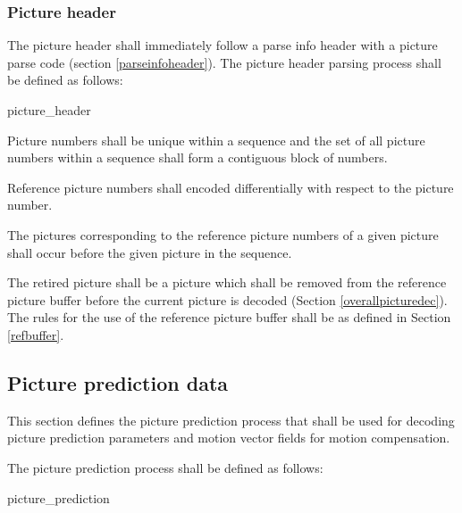 \subsubsection{Picture header}
\label{pictureheader}

The picture header shall immediately follow a parse info header with a picture parse 
code (section \ref{parseinfoheader}). The picture header parsing process shall be defined as follows:

\begin{pseudo}{picture\_header}{}
    \bsEND\bsEND
{}
\bsEND
\end{pseudo}

Picture numbers shall be unique within a sequence and the set of all picture numbers
within a sequence shall form a contiguous block of numbers.

Reference picture numbers shall encoded differentially with respect to the
picture number.

The pictures corresponding to the reference picture numbers of a given picture
shall occur before the given picture in the sequence.

The retired picture shall be a picture which shall be removed from 
the reference picture buffer before the current picture is decoded
(Section \ref{overallpicturedec}). The rules for the 
use of the reference picture buffer shall be as defined in Section \ref{refbuffer}.

\subsection{Picture prediction data}
\label{pictureprediction}

This section defines the picture prediction process that shall be used for decoding 
picture prediction parameters and motion vector fields for motion compensation.

The picture prediction process shall be defined as follows:

\begin{pseudo}{picture\_prediction}{}
\end{pseudo}

